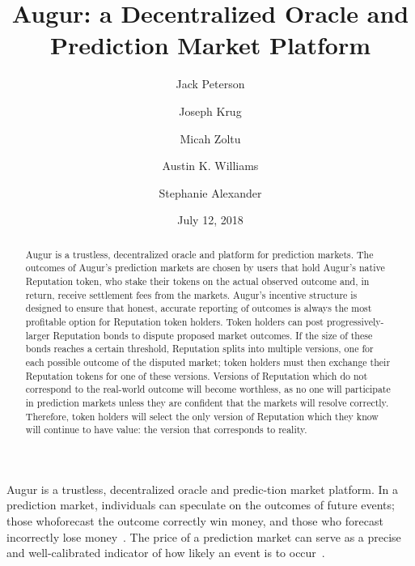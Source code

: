 \documentclass[12pt,floatfix,reprint,nofootinbib,amsmath,amssymb,epsfig,pre,floats,letterpaper,groupedaffiliation]{revtex4-1}
\theoremstyle{definition}
\theoremstyle{definition}
\begin{document}
\flushbottom


\title{Augur: a Decentralized Oracle and Prediction Market Platform}

\author{Jack Peterson}
\author{Joseph Krug}
\author{Micah Zoltu}
\author{Austin K. Williams}
\author{Stephanie Alexander}
\date{July 12, 2018}

\begin{abstract}

\vspace{0pt plus 20pt}
Augur is a trustless, decentralized oracle and platform for prediction markets. The outcomes of Augur's prediction markets are chosen by users that hold Augur's native Reputation token, who stake their tokens on the actual observed outcome and, in return, receive settlement fees from the markets. Augur's incentive structure is designed to ensure that honest, accurate reporting of outcomes is always the most profitable option for Reputation token holders. Token holders can post progressively-larger Reputation bonds to dispute proposed market outcomes. If the size of these bonds reaches a certain threshold, Reputation splits into multiple versions, one for each possible outcome of the disputed market; token holders must then exchange their Reputation tokens for one of these versions. Versions of Reputation which do not correspond to the real-world outcome will become worthless, as no one will participate in prediction markets unless they are confident that the markets will resolve correctly. Therefore, token holders will select the only version of Reputation which they know will continue to have value: the version that corresponds to reality.
\end{abstract}

\maketitle

Augur is a trustless, decentralized oracle and predic-\linebreak tion market platform. In a prediction market, \mbox{individuals} can speculate on the outcomes of future events; those who\linebreak forecast the outcome correctly win money, and those who forecast incorrectly lose money~\cite{Wolfers_2004,Surowiecki_2005,Hanson_2006}. The price of a prediction market can serve as a precise and well-calibrated indicator of how likely an event is to occur~\cite{Pennock_2001,Manski_2004,Wolfers_2005,Goel_2010}.
\end{document}
